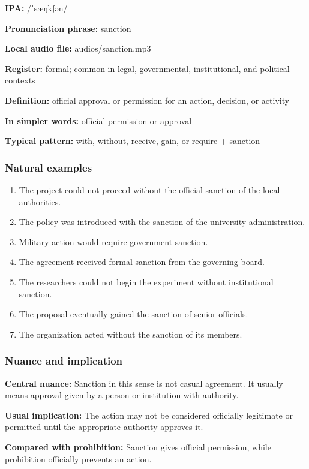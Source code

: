 \documentclass[11pt]{article}
\begin{document}
\textbf{IPA:} /ˈsæŋkʃən/

\textbf{Pronunciation phrase:} sanction

\textbf{Local audio file:} audios/sanction.mp3

\textbf{Register:} formal; common in legal, governmental, institutional, and political contexts

\textbf{Definition:} official approval or permission for an action, decision, or activity

\textbf{In simpler words:} official permission or approval

\textbf{Typical pattern:} with, without, receive, gain, or require + sanction

\subsubsection{Natural examples}
\begin{enumerate}
  \item The project could not proceed without the official sanction of the local authorities.
  \item The policy was introduced with the sanction of the university administration.
  \item Military action would require government sanction.
  \item The agreement received formal sanction from the governing board.
  \item The researchers could not begin the experiment without institutional sanction.
  \item The proposal eventually gained the sanction of senior officials.
  \item The organization acted without the sanction of its members.
\end{enumerate}

\subsubsection{Nuance and implication}
\textbf{Central nuance:} Sanction in this sense is not casual agreement. It usually means approval given by a person or institution with authority.

\textbf{Usual implication:} The action may not be considered officially legitimate or permitted until the appropriate authority approves it.

\textbf{Compared with prohibition:} Sanction gives official permission, while prohibition officially prevents an action.
\end{document}
